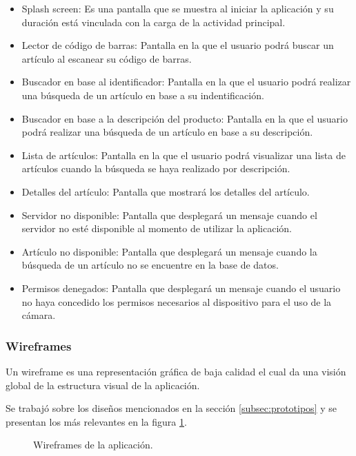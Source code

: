 \begin{itemize}
	\item Splash screen: Es una pantalla que se muestra al iniciar la aplicación y su duración está vinculada con la carga de la actividad principal.
	\item Lector de código de barras: Pantalla en la que el usuario podrá buscar un artículo al escanear su código de barras.
	\item Buscador en base al identificador: Pantalla en la que el usuario podrá realizar una búsqueda de un artículo en base a su indentificación.
	\item Buscador en base a la descripción del producto: Pantalla en la que el usuario podrá realizar una búsqueda de un artículo en base a su descripción.
	\item Lista de artículos: Pantalla en la que el usuario podrá visualizar una lista de artículos cuando la búsqueda se haya realizado por descripción.
	\item Detalles del artículo: Pantalla que mostrará los detalles del artículo.
	\item Servidor no disponible: Pantalla que desplegará un mensaje cuando el servidor no esté disponible al momento de utilizar la aplicación.
	\item Artículo no disponible: Pantalla que desplegará un mensaje cuando la búsqueda de un artículo no se encuentre en la base de datos.
	\item Permisos denegados: Pantalla que desplegará un mensaje cuando el usuario no haya concedido los permisos necesarios al dispositivo para el uso de la cámara.
\end{itemize}

\subsubsection{Wireframes}
Un wireframe es una representación gráfica de baja calidad el cual da una visión global de la estructura visual de la aplicación.

Se trabajó sobre los diseños mencionados en la sección \ref{subsec:prototipos} y se presentan los más relevantes en la figura \ref{wireframes}.

\begin{figure}[!h]
	\centering
	\caption{Wireframes de la aplicación.}
	\label{wireframes}
\end{figure}


